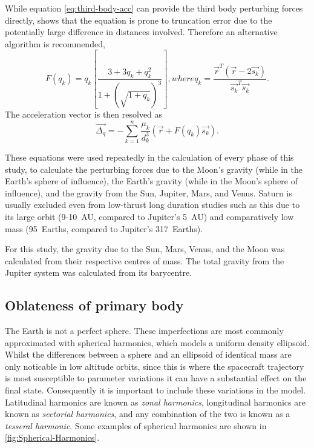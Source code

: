 While equation \eqref{eq:third-body-acc} can provide the third body perturbing forces directly, \textcite{Battin1999} shows that the equation is prone to truncation error due to the potentially large difference in distances involved. Therefore an alternative algorithm is recommended,
\begin{subequations}
\begin{equation} \label{eq:Fqk}
F(q_k) = q_k\left[ \frac{3+3q_{k}+q_{k}^{2}}{1+(\sqrt{1+q_{k}})^{3}} \right] ,
\end{equation} 
where
\begin{equation}
q_k = \frac{\vec{r}^{T}(\vec{r}-2\vec{s_{k}})}{\vec{s_k}^{T}\vec{s_k}}.
\end{equation}
\end{subequations}
The acceleration vector is then resolved as
\begin{equation}\label{eq:delta-q}
\vec{\Delta_q} = -\sum_{k=1}^{n}\frac{\mu_{k}}{d_{k}^{3}}(\vec{r}+F(q_{k})\vec{s_{k}}).
\end{equation}

These equations were used repeatedly in the calculation of every phase of this study, to calculate the perturbing forces due to the Moon's gravity (while in the Earth's sphere of influence), the Earth's gravity (while in the Moon's sphere of influence), and the gravity from the Sun, Jupiter, Mars, and Venus. Saturn is usually excluded even from low-thrust long duration studies such as this due to its large orbit (9-10~AU, compared to Jupiter's 5~AU) and comparatively low mass (95~Earths, compared to Jupiter's 317~Earths). 

For this study, the gravity due to the Sun, Mars, Venus, and the Moon was calculated from their respective centres of mass. The total gravity from the Jupiter system was calculated from its barycentre.



\subsection{Oblateness of primary body} \label{sub:Oblateness}

The Earth is not a perfect sphere. These imperfections are most commonly approximated with spherical harmonics, which models a uniform density ellipsoid. Whilst the differences between a sphere and an ellipsoid of identical mass are only noticable in low altitude orbits, since this is where the spacecraft trajectory is most susceptible to parameter variations it can have a substantial effect on the final state. Consequently it is important to include these variations in the model. Latitudinal harmonics are known as \emph{zonal harmonics}, longitudinal harmonics are known as \emph{sectorial harmonics}, and any combination of the two is known as a \emph{tesseral harmonic}. Some examples of spherical harmonics are shown in \autoref{fig:Spherical-Harmonics}.

